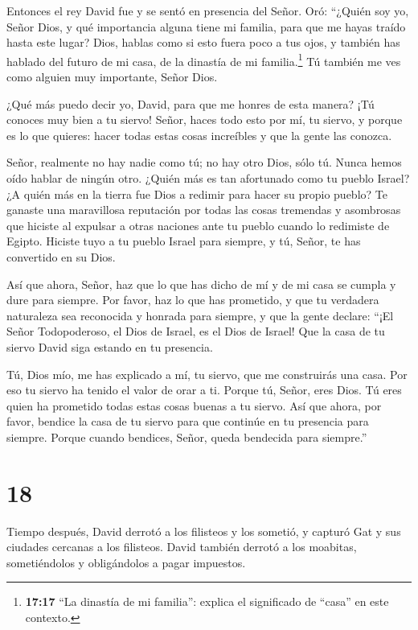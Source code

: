  Entonces el rey David fue y se sentó en presencia del
Señor. Oró: ``¿Quién soy yo, Señor Dios, y qué importancia alguna tiene
mi familia, para que me hayas traído hasta este lugar? 
Dios, hablas como si esto fuera poco a tus ojos, y también has hablado
del futuro de mi casa, de la dinastía de mi familia.\footnote{\textbf{17:17}
  ``La dinastía de mi familia'': explica el significado de ``casa'' en
  este contexto.} Tú también me ves como alguien muy importante, Señor
Dios.

 ¿Qué más puedo decir yo, David, para que me honres de esta
manera? ¡Tú conoces muy bien a tu siervo!  Señor, haces
todo esto por mí, tu siervo, y porque es lo que quieres: hacer todas
estas cosas increíbles y que la gente las conozca.

 Señor, realmente no hay nadie como tú; no hay otro Dios,
sólo tú. Nunca hemos oído hablar de ningún otro.  ¿Quién
más es tan afortunado como tu pueblo Israel? ¿A quién más en la tierra
fue Dios a redimir para hacer su propio pueblo? Te ganaste una
maravillosa reputación por todas las cosas tremendas y asombrosas que
hiciste al expulsar a otras naciones ante tu pueblo cuando lo redimiste
de Egipto.  Hiciste tuyo a tu pueblo Israel para siempre, y
tú, Señor, te has convertido en su Dios.

 Así que ahora, Señor, haz que lo que has dicho de mí y de
mi casa se cumpla y dure para siempre. Por favor, haz lo que has
prometido,  y que tu verdadera naturaleza sea reconocida y
honrada para siempre, y que la gente declare: ``¡El Señor Todopoderoso,
el Dios de Israel, es el Dios de Israel! Que la casa de tu siervo David
siga estando en tu presencia.

 Tú, Dios mío, me has explicado a mí, tu siervo, que me
construirás una casa. Por eso tu siervo ha tenido el valor de orar a ti.
 Porque tú, Señor, eres Dios. Tú eres quien ha prometido
todas estas cosas buenas a tu siervo.  Así que ahora, por
favor, bendice la casa de tu siervo para que continúe en tu presencia
para siempre. Porque cuando bendices, Señor, queda bendecida para
siempre.''

\hypertarget{section-17}{%
\section{18}\label{section-17}}

 Tiempo después, David derrotó a los filisteos y los
sometió, y capturó Gat y sus ciudades cercanas a los filisteos.
 David también derrotó a los moabitas, sometiéndolos y
obligándolos a pagar impuestos.

